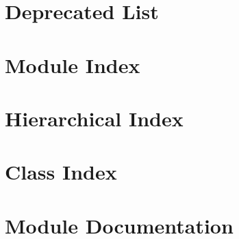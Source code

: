 \let\mypdfximage\pdfximage\def\pdfximage{\immediate\mypdfximage}\documentclass[twoside]{book}
\newcommand{\+}{\discretionary{\mbox{\scriptsize$\hookleftarrow$}}{}{}}
\begin{document}
\chapter{Deprecated List}
\label{deprecated}

\chapter{Module Index}

\chapter{Hierarchical Index}

\chapter{Class Index}

\chapter{Module Documentation}


\end{document}
